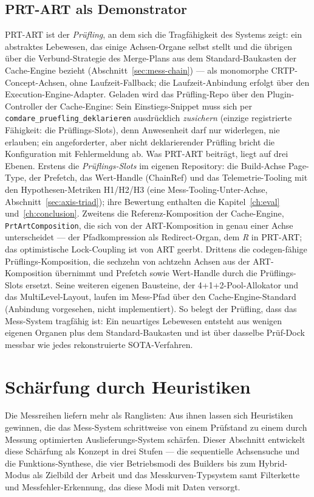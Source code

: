 \begin{nurkurz}
\section{PRT-ART als Demonstrator}\label{sec:prtart-demo}
PRT-ART ist der \emph{Prüfling}, an dem sich die Tragfähigkeit des Systems zeigt: ein abstraktes Lebewesen, das
einige Achsen-Organe selbst stellt und die übrigen über die Verbund-Strategie des Merge-Plans aus dem
Standard-Baukasten der Cache-Engine bezieht (Abschnitt~\ref{sec:mess-chain}) --- als monomorphe
CRTP-Concept-Achsen, ohne Laufzeit-Fallback; die Laufzeit-Anbindung erfolgt über den Execution-Engine-Adapter.
Geladen wird das Prüfling-Repo über den Plugin-Controller der Cache-Engine: Sein Einstiegs-Snippet muss sich
per \texttt{comdare\_\allowbreak{}pruefling\_\allowbreak{}deklarieren} ausdrücklich \emph{zusichern} (einzige
registrierte Fähigkeit: die Prüflings-Slots), denn Anwesenheit darf nur widerlegen, nie erlauben; ein
angeforderter, aber nicht deklarierender Prüfling bricht die Konfiguration mit Fehlermeldung ab. Was PRT-ART
beiträgt, liegt auf drei Ebenen. Erstens die \emph{Prüflings-Slots} im eigenen Repository: die Build-Achse
Page-Type, der Prefetch, das Wert-Handle (ChainRef) und das Telemetrie-Tooling mit den Hypothesen-Metriken
H1/H2/H3 (eine Mess-Tooling-Unter-Achse, Abschnitt~\ref{sec:axis-triad}); ihre Bewertung enthalten die
Kapitel~\ref{ch:eval} und~\ref{ch:conclusion}. Zweitens die Referenz-Komposition der Cache-Engine,
\texttt{PrtArtComposition}, die sich von der ART-Komposition in genau einer Achse unterscheidet --- der
Pfadkompression als Redirect-Organ, dem \emph{R} in PRT-ART\@; das optimistische Lock-Coupling ist von ART
geerbt. Drittens die codegen-fähige Prüflings-Komposition, die sechzehn von achtzehn Achsen aus der
ART-Komposition übernimmt und Prefetch sowie Wert-Handle durch die Prüflings-Slots ersetzt. Seine weiteren
eigenen Bausteine, der 4+1+2-Pool-Allokator und das MultiLevel-Layout, laufen im Mess-Pfad über den
Cache-Engine-Standard (Anbindung vorgesehen, nicht implementiert). So belegt der Prüfling, dass das Mess-System
tragfähig ist: Ein neuartiges Lebewesen entsteht aus wenigen eigenen Organen plus dem Standard-Baukasten und
ist über dasselbe Prüf-Dock messbar wie jedes rekonstruierte SOTA-Verfahren.
\end{nurkurz}

\section{Schärfung durch Heuristiken}\label{sec:heuristics}
Die Messreihen liefern mehr als Ranglisten: Aus ihnen lassen sich Heuristiken gewinnen, die das
Mess-System schrittweise von einem Prüfstand zu einem durch Messung optimierten Auslieferungs-System
schärfen. Dieser Abschnitt entwickelt diese Schärfung als Konzept in drei Stufen --- die
sequentielle Achsensuche und die Funktions-Synthese, die vier Betriebsmodi des Builders bis zum Hybrid-Modus
als Zielbild der Arbeit und das Messkurven-Typsystem samt Filterkette und Messfehler-Erkennung, das
diese Modi mit Daten versorgt.

